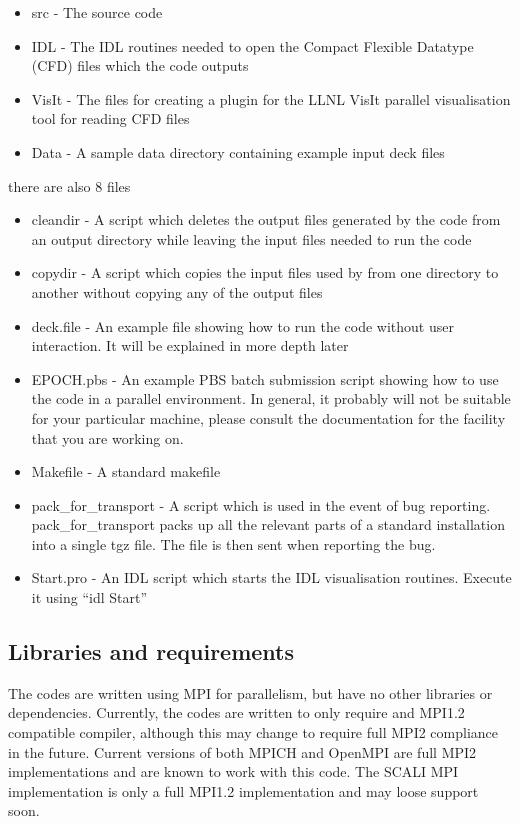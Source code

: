 \documentclass[12pt,a4paper]{article}
\newcommand{\EPOCH}{{\color{warwickdark}\fontfamily{phv}\selectfont{EPOCH}}}
\begin{document}
\begin{itemize}
\item src - The {\EPOCH} source code
\item IDL - The IDL routines needed to open the Compact Flexible Datatype
  (CFD) files which the code outputs
\item VisIt - The files for creating a plugin for the LLNL VisIt parallel
  visualisation tool for reading CFD files
\item Data - A sample data directory containing example input deck files
\end{itemize}
there are also 8 files

\begin{itemize}
\item cleandir - A script which deletes the output files generated by the
  {\EPOCH} code from an output directory while leaving the input files needed to
  run the code
\item copydir - A script which copies the input files used by {\EPOCH} from one
  directory to another without copying any of the output files
\item deck.file - An example file showing how to run the code without user
  interaction. It will be explained in more depth later
\item EPOCH.pbs - An example PBS batch submission script showing how to use
  the code in a parallel environment. In general, it probably will not be
  suitable for your particular machine, please consult the documentation for
  the facility that you are working on.
\item Makefile - A standard makefile
\item pack\_for\_transport - A script which is used in the event of bug
  reporting. pack\_for\_transport packs up all the relevant parts of a
  standard {\EPOCH} installation into a single tgz file. The file is then sent
  when reporting the bug.
\item Start.pro - An IDL script which starts the IDL visualisation
  routines. Execute it using ``idl Start''
\end{itemize}

\subsection{Libraries and requirements}
The {\EPOCH} codes are written using MPI for parallelism, but have no other
libraries or dependencies. Currently, the codes are written to only require and
MPI1.2 compatible compiler, although this may change to require full MPI2
compliance in the future. Current versions of both MPICH and OpenMPI are full
MPI2 implementations and are known to work with this code. The SCALI MPI
implementation is only a full MPI1.2 implementation and may loose support
soon.\\
\end{document}
